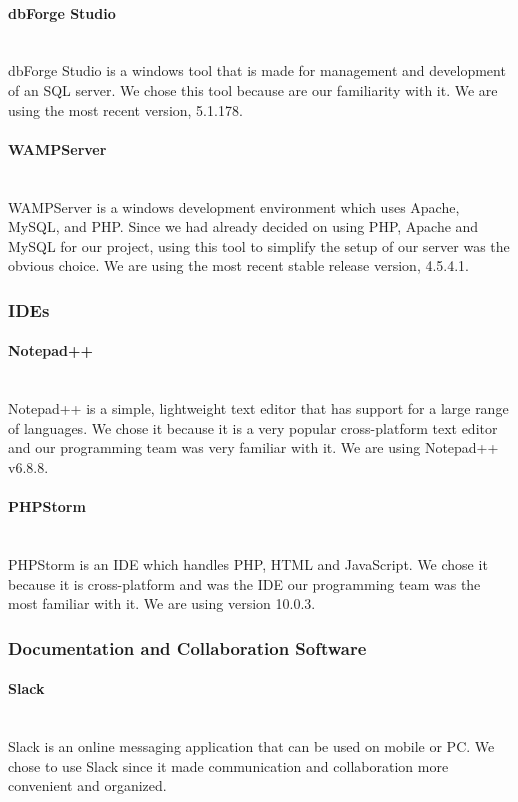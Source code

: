 \documentclass[12pt]{article}
\begin{document}
\paragraph*{dbForge Studio}~\\
dbForge Studio is a windows tool that is made for management and development of an SQL server. We chose this tool because are our familiarity with it. We are using the most recent version, 5.1.178.
%
\paragraph*{WAMPServer}~\\
WAMPServer is a windows development environment which uses Apache, MySQL, and PHP. Since we had already decided on using PHP, Apache and MySQL for our project, using this tool to simplify the setup of our server was the obvious choice. We are using the most recent stable release version, 4.5.4.1.
%
\subsubsection{IDEs}
\paragraph*{Notepad++}~\\
Notepad++ is a simple, lightweight text editor that has support for a large range of languages. We chose it because it is a very popular cross-platform text editor and our programming team was very familiar with it. We are using Notepad++ v6.8.8.
%
\paragraph*{PHPStorm}~\\
PHPStorm is an IDE which handles PHP, HTML and JavaScript. We chose it because it is cross-platform and was the IDE our programming team was the most familiar with it. We are using version 10.0.3.
%
%
%
\subsubsection{Documentation and Collaboration Software}
\paragraph*{Slack}~\\
Slack is an online messaging application that can be used on mobile or PC. We chose to use Slack since it made communication and collaboration more convenient and organized.
%
\end{document}
